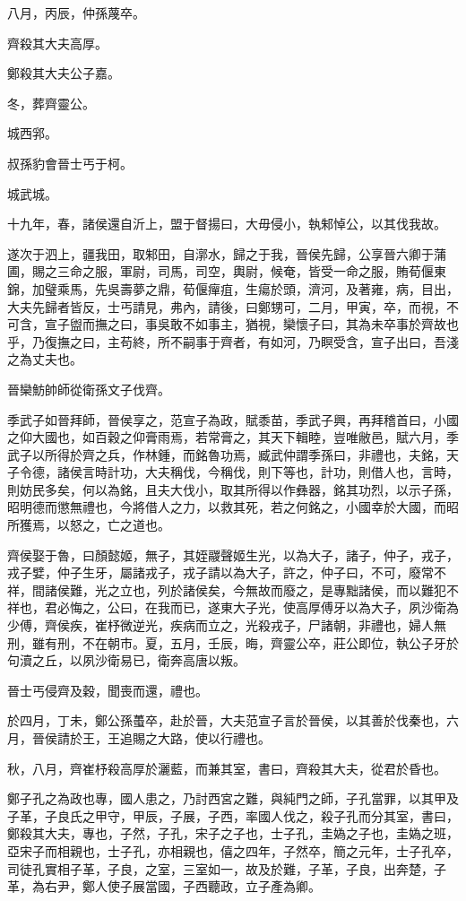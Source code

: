 \begin{pinyinscope}
八月，丙辰，仲孫蔑卒。

齊殺其大夫高厚。

鄭殺其大夫公子嘉。

冬，葬齊靈公。

城西郛。

叔孫豹會晉士丐于柯。

城武城。

十九年，春，諸侯還自沂上，盟于督揚曰，大毋侵小，執邾悼公，以其伐我故。

遂次于泗上，疆我田，取邾田，自漷水，歸之于我，晉侯先歸，公享晉六卿于蒲圃，賜之三命之服，軍尉，司馬，司空，輿尉，候奄，皆受一命之服，賄荀偃東錦，加璧乘馬，先吳壽夢之鼎，荀偃癉疽，生瘍於頭，濟河，及著雍，病，目出，大夫先歸者皆反，士丐請見，弗內，請後，曰鄭甥可，二月，甲寅，卒，而視，不可含，宣子盥而撫之曰，事吳敢不如事主，猶視，欒懷子曰，其為未卒事於齊故也乎，乃復撫之曰，主苟終，所不嗣事于齊者，有如河，乃瞑受含，宣子出曰，吾淺之為丈夫也。

晉欒魴帥師從衛孫文子伐齊。

季武子如晉拜師，晉侯享之，范宣子為政，賦黍苗，季武子興，再拜稽首曰，小國之仰大國也，如百穀之仰膏雨焉，若常膏之，其天下輯睦，豈唯敝邑，賦六月，季武子以所得於齊之兵，作林鍾，而銘魯功焉，臧武仲謂季孫曰，非禮也，夫銘，天子令德，諸侯言時計功，大夫稱伐，今稱伐，則下等也，計功，則借人也，言時，則妨民多矣，何以為銘，且夫大伐小，取其所得以作彝器，銘其功烈，以示子孫，昭明德而懲無禮也，今將借人之力，以救其死，若之何銘之，小國幸於大國，而昭所獲焉，以怒之，亡之道也。

齊侯娶于魯，曰顏懿姬，無子，其姪鬷聲姬生光，以為大子，諸子，仲子，戎子，戎子嬖，仲子生牙，屬諸戎子，戎子請以為大子，許之，仲子曰，不可，廢常不祥，間諸侯難，光之立也，列於諸侯矣，今無故而廢之，是專黜諸侯，而以難犯不祥也，君必悔之，公曰，在我而已，遂東大子光，使高厚傅牙以為大子，夙沙衛為少傅，齊侯疾，崔杼微逆光，疾病而立之，光殺戎子，尸諸朝，非禮也，婦人無刑，雖有刑，不在朝市。夏，五月，壬辰，晦，齊靈公卒，莊公即位，執公子牙於句瀆之丘，以夙沙衛易已，衛奔高唐以叛。

晉士丐侵齊及穀，聞喪而還，禮也。

於四月，丁未，鄭公孫蠆卒，赴於晉，大夫范宣子言於晉侯，以其善於伐秦也，六月，晉侯請於王，王追賜之大路，使以行禮也。

秋，八月，齊崔杼殺高厚於灑藍，而兼其室，書曰，齊殺其大夫，從君於昏也。

鄭子孔之為政也專，國人患之，乃討西宮之難，與純門之師，子孔當罪，以其甲及子革，子良氏之甲守，甲辰，子展，子西，率國人伐之，殺子孔而分其室，書曰，鄭殺其大夫，專也，子然，子孔，宋子之子也，士子孔，圭媯之子也，圭媯之班，亞宋子而相親也，士子孔，亦相親也，僖之四年，子然卒，簡之元年，士子孔卒，司徒孔實相子革，子良，之室，三室如一，故及於難，子革，子良，出奔楚，子革，為右尹，鄭人使子展當國，子西聽政，立子產為卿。


\end{pinyinscope}
